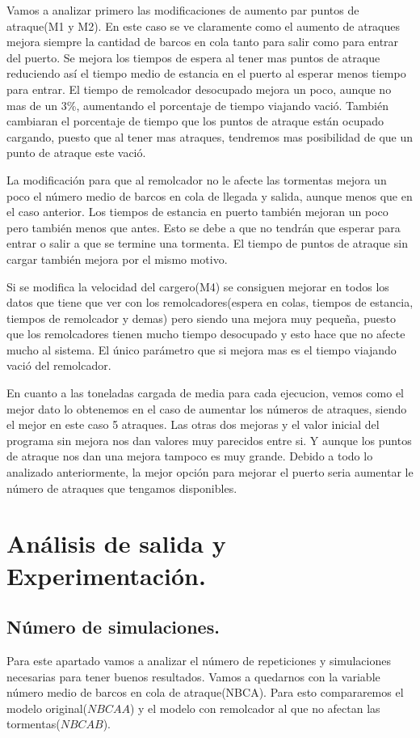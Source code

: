 \documentclass[]{article}
\begin{document}
Vamos a analizar primero las modificaciones de aumento par puntos de atraque(M1 y M2). En este caso se ve claramente como el aumento de atraques mejora siempre la cantidad de barcos en cola tanto para salir como para entrar del puerto. Se mejora los tiempos de espera al tener mas puntos de atraque reduciendo así el tiempo medio de estancia en el puerto al esperar menos tiempo para entrar. El tiempo de remolcador desocupado mejora un poco, aunque no mas de un 3\%, aumentando el porcentaje de tiempo viajando vació. También cambiaran el porcentaje de tiempo que los puntos de atraque están ocupado cargando, puesto que al tener mas atraques, tendremos mas posibilidad de que un punto de atraque este vació.
\newline

La modificación para que al remolcador no le afecte las tormentas mejora un poco el número medio de barcos en cola de llegada y salida, aunque menos que en el caso anterior. Los tiempos de estancia en puerto también mejoran un poco pero también menos que antes. Esto se debe a que no tendrán que esperar para entrar o salir a que se termine una tormenta. El tiempo de puntos de atraque sin cargar también mejora por el mismo motivo.
\newline

Si se modifica la velocidad del cargero(M4) se consiguen mejorar en todos los datos que tiene que ver con los remolcadores(espera en colas, tiempos de estancia, tiempos de remolcador y demas) pero siendo una mejora muy pequeña, puesto que los remolcadores tienen mucho tiempo desocupado y esto hace que no afecte mucho al sistema. El único parámetro que si mejora mas es el tiempo viajando vació del remolcador. 
\newline

En cuanto a las toneladas cargada de media para cada ejecucion, vemos como el mejor dato lo obtenemos en el caso de aumentar los números de atraques, siendo el mejor en este caso 5 atraques. Las otras dos mejoras y el valor inicial del programa sin mejora nos dan valores muy parecidos entre si. Y aunque los puntos de atraque nos dan una mejora tampoco es muy grande. 
Debido a todo lo analizado anteriormente, la mejor opción para mejorar el puerto seria aumentar le número de atraques que tengamos disponibles.

\section{Análisis de salida y Experimentación.}
\subsection{Número de simulaciones.}
Para este apartado vamos a analizar el número de repeticiones y simulaciones necesarias para tener buenos resultados. Vamos a quedarnos con la variable número medio de barcos en cola de atraque(NBCA). Para esto compararemos el modelo original($NBCAA$) y el modelo con remolcador al que no afectan las tormentas($NBCAB$). 
\end{document}
